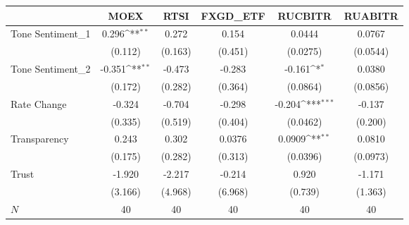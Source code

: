 {
\def\sym#1{\ifmmode^{#1}\else\(^{#1}\)\fi}
\begin{tabular}{l*{5}{c}}
\hline\hline
            &\multicolumn{1}{c}{MOEX}&\multicolumn{1}{c}{RTSI}&\multicolumn{1}{c}{FXGD\_ETF}&\multicolumn{1}{c}{RUCBITR}&\multicolumn{1}{c}{RUABITR}\\
\hline
Tone Sentiment\_{1}&       0.296\sym{**} &       0.272         &       0.154         &      0.0444         &      0.0767         \\
            &     (0.112)         &     (0.163)         &     (0.451)         &    (0.0275)         &    (0.0544)         \\
[1em]
Tone Sentiment\_{2}&      -0.351\sym{**} &      -0.473         &      -0.283         &      -0.161\sym{*}  &      0.0380         \\
            &     (0.172)         &     (0.282)         &     (0.364)         &    (0.0864)         &    (0.0856)         \\
[1em]
Rate Change &      -0.324         &      -0.704         &      -0.298         &      -0.204\sym{***}&      -0.137         \\
            &     (0.335)         &     (0.519)         &     (0.404)         &    (0.0462)         &     (0.200)         \\
[1em]
Transparency&       0.243         &       0.302         &      0.0376         &      0.0909\sym{**} &      0.0810         \\
            &     (0.175)         &     (0.282)         &     (0.313)         &    (0.0396)         &    (0.0973)         \\
[1em]
Trust       &      -1.920         &      -2.217         &      -0.214         &       0.920         &      -1.171         \\
            &     (3.166)         &     (4.968)         &     (6.968)         &     (0.739)         &     (1.363)         \\
\hline
\(N\)       &          40         &          40         &          40         &          40         &          40         \\
\hline\hline
\end{tabular}
}

